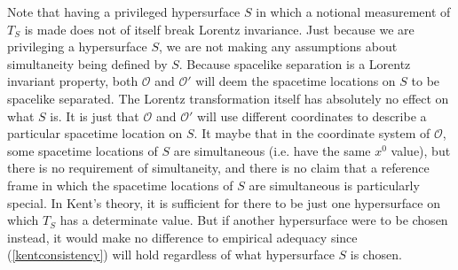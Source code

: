 \documentclass[12pt]{report}
\begin{document}
Note that having a privileged hypersurface $S$ in which a notional measurement of $T_S$ is made does not of itself break Lorentz invariance. Just because we are privileging a hypersurface $S$, we are not making any assumptions about simultaneity being defined by $S$. Because spacelike separation is a Lorentz invariant property, both $\mathcal{O}$ and $\mathcal{O}'$ will deem the spacetime locations on $S$ to be spacelike separated. The Lorentz transformation itself has absolutely no effect on what $S$ is. It is just that $\mathcal{O}$ and $\mathcal{O}'$ will use different coordinates to describe a particular spacetime location on $S$. It maybe that in the coordinate system of $\mathcal{O}$, some spacetime locations of $S$ are simultaneous (i.e. have the same $x^0$ value), but there is no requirement of simultaneity, and there is no claim that a reference frame in which the spacetime locations of $S$ are simultaneous is particularly special. In Kent's theory, it is sufficient for there to be just one hypersurface on which  $T_S$ has a determinate value. But if another hypersurface were to be chosen instead, it would make no difference to empirical adequacy since (\ref{kentconsistency}) will hold regardless of what hypersurface $S$ is chosen.
\end{document}
